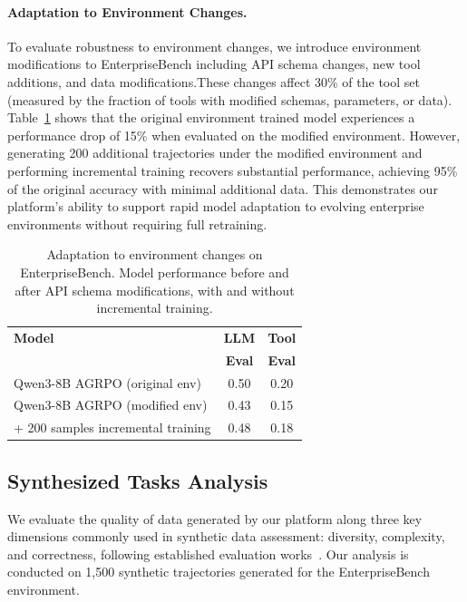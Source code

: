 \documentclass{article}
\theoremstyle{plain}
\theoremstyle{definition}
\theoremstyle{remark}
\begin{document}
\vspace{-0.2cm}
\paragraph{Adaptation to Environment Changes.}
To evaluate robustness to environment changes, we introduce environment modifications to EnterpriseBench including API schema changes, new tool additions, and data modifications.These changes affect 30\% of the tool set (measured by the fraction of tools with modified schemas, parameters, or data). Table~\ref{tab:env_adaptation} shows that the original environment trained model experiences a performance drop of 15\% when evaluated on the modified environment. However, generating 200 additional trajectories under the modified environment and performing incremental training recovers substantial performance, achieving 95\% of the original accuracy with minimal additional data. This demonstrates our platform's ability to support rapid model adaptation to evolving enterprise environments without requiring full retraining.

\begin{table}[t]
\centering
\caption{Adaptation to environment changes on EnterpriseBench. Model performance before and after API schema modifications, with and without incremental training.}
\label{tab:env_adaptation}
\small
\begin{tabular}{l|cc}
\toprule
\textbf{Model} & \textbf{LLM} & \textbf{Tool} \\
& \textbf{Eval} & \textbf{Eval} \\
\midrule
Qwen3-8B AGRPO (original env) & 0.50 & 0.20 \\
Qwen3-8B AGRPO (modified env) & 0.43 & 0.15 \\
\quad + 200 samples incremental training & 0.48 & 0.18 \\
\bottomrule
\end{tabular}
\end{table}


\vspace{-0.2cm}
\subsection{Synthesized Tasks Analysis}
\vspace{-0.2cm}
We evaluate the quality of data generated by our platform along three key dimensions commonly used in synthetic data assessment: diversity, complexity, and correctness, following established evaluation works~\cite{liutoolace, havrilla2024surveying}. Our analysis is conducted on 1,500 synthetic trajectories generated for the EnterpriseBench environment.
\end{document}
